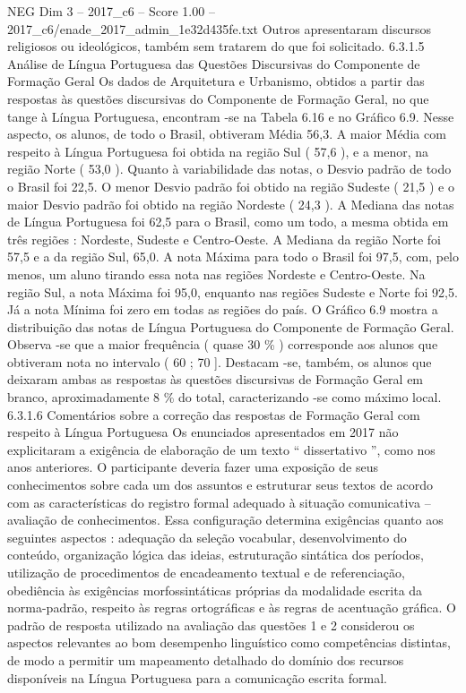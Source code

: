 \begin{textsample}{NEG Dim 3 – 2017\_c6 – Score 1.00 – 2017\_c6/enade\_2017\_admin\_1e32d435fe.txt}
Outros apresentaram discursos religiosos ou ideológicos, também sem tratarem do que foi solicitado. 6.3.1.5 Análise de Língua Portuguesa das Questões Discursivas do Componente de Formação Geral Os dados de Arquitetura e Urbanismo, obtidos a partir das respostas às questões discursivas do Componente de Formação Geral, no que tange à Língua Portuguesa, encontram -se na Tabela 6.16 e no Gráfico 6.9.
Nesse aspecto, os alunos, de todo o Brasil, obtiveram Média 56,3.
A maior Média com respeito à Língua Portuguesa foi obtida na região Sul ( 57,6 ), e a menor, na região Norte ( 53,0 ).
Quanto à variabilidade das notas, o Desvio padrão de todo o Brasil foi 22,5.
O menor Desvio padrão foi obtido na região Sudeste ( 21,5 ) e o maior Desvio padrão foi obtido na região Nordeste ( 24,3 ).
A Mediana das notas de Língua Portuguesa foi 62,5 para o Brasil, como um todo, a mesma obtida em três regiões : Nordeste, Sudeste e Centro-Oeste.
A Mediana da região Norte foi 57,5 e a da região Sul, 65,0.
A nota Máxima para todo o Brasil foi 97,5, com, pelo menos, um aluno tirando essa nota nas regiões Nordeste e Centro-Oeste.
Na região Sul, a nota Máxima foi 95,0, enquanto nas regiões Sudeste e Norte foi 92,5.
Já a nota Mínima foi zero em todas as regiões do país.
O Gráfico 6.9 mostra a distribuição das notas de Língua Portuguesa do Componente de Formação Geral.
Observa -se que a maior frequência ( quase 30 \% ) corresponde aos alunos que obtiveram nota no intervalo ( 60 ; 70 ].
Destacam -se, também, os alunos que deixaram ambas as respostas às questões discursivas de Formação Geral em branco, aproximadamente 8 \% do total, caracterizando -se como máximo local. 6.3.1.6 Comentários sobre a correção das respostas de Formação Geral com respeito à Língua Portuguesa Os enunciados apresentados em 2017 não explicitaram a exigência de elaboração de um texto “ dissertativo ”, como nos anos anteriores.
O participante deveria fazer uma exposição de seus conhecimentos sobre cada um dos assuntos e estruturar seus textos de acordo com as características do registro formal adequado à situação comunicativa – avaliação de conhecimentos.
Essa configuração determina exigências quanto aos seguintes aspectos : adequação da seleção vocabular, desenvolvimento do conteúdo, organização lógica das ideias, estruturação sintática dos períodos, utilização de procedimentos de encadeamento textual e de referenciação, obediência às exigências morfossintáticas próprias da modalidade escrita da norma-padrão, respeito às regras ortográficas e às regras de acentuação gráfica.
O padrão de resposta utilizado na avaliação das questões 1 e 2 considerou os aspectos relevantes ao bom desempenho linguístico como competências distintas, de modo a permitir um mapeamento detalhado do domínio dos recursos disponíveis na Língua Portuguesa para a comunicação escrita formal.

\end{textsample}
